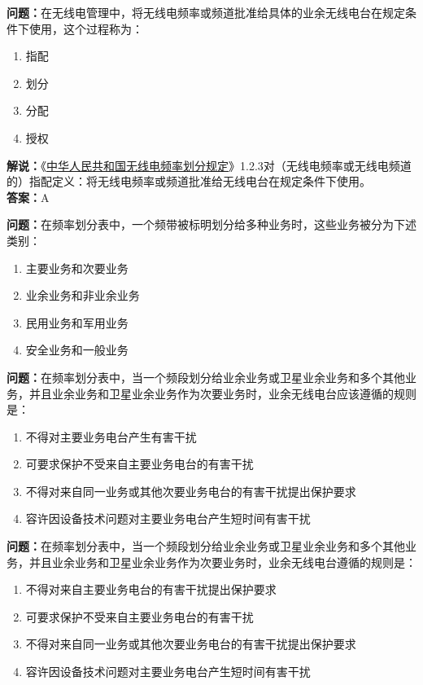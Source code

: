 \textbf{问题：}在无线电管理中，将无线电频率或频道批准给具体的业余无线电台在规定条件下使用，这个过程称为：
\begin{enumerate}[label=\Alph*), leftmargin=1cm]
	\item 指配
	\item 划分
	\item 分配
	\item 授权
\end{enumerate}
\textbf{解说：}《\href{https://www.miit.gov.cn/zwgk/zcwj/wjfb/txy/art/2020/art_066386284cd2449493586c81ccafed11.html}{中华人民共和国无线电频率划分规定}》1.2.3对（无线电频率或无线电频道的）指配定义：将无线电频率或频道批准给无线电台在规定条件下使用。\\
\textbf{答案：}A

\textbf{问题：}在频率划分表中，一个频带被标明划分给多种业务时，这些业务被分为下述类别：
\begin{enumerate}[label=\Alph*), leftmargin=1cm]
	\item 主要业务和次要业务
	\item 业余业务和非业余业务
	\item 民用业务和军用业务
	\item 安全业务和一般业务
\end{enumerate}

\textbf{问题：}在频率划分表中，当一个频段划分给业余业务或卫星业余业务和多个其他业务，并且业余业务和卫星业余业务作为次要业务时，业余无线电台应该遵循的规则是：
\begin{enumerate}[label=\Alph*), leftmargin=1cm]
	\item 不得对主要业务电台产生有害干扰
	\item 可要求保护不受来自主要业务电台的有害干扰
	\item 不得对来自同一业务或其他次要业务电台的有害干扰提出保护要求
	\item 容许因设备技术问题对主要业务电台产生短时间有害干扰
\end{enumerate}

\textbf{问题：}在频率划分表中，当一个频段划分给业余业务或卫星业余业务和多个其他业务，并且业余业务和卫星业余业务作为次要业务时，业余无线电台遵循的规则是：
\begin{enumerate}[label=\Alph*), leftmargin=1cm]
	\item 不得对来自主要业务电台的有害干扰提出保护要求
	\item 可要求保护不受来自主要业务电台的有害干扰
	\item 不得对来自同一业务或其他次要业务电台的有害干扰提出保护要求
	\item 容许因设备技术问题对主要业务电台产生短时间有害干扰
\end{enumerate}

